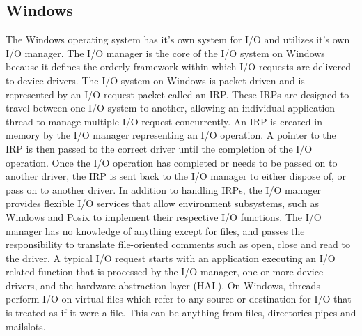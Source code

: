 \documentclass[10pt,draftclsnofoot,onecolumn,journal,compsoc]{IEEEtran}
\begin{document}
\subsection*{Windows}
The Windows operating system has it's own system for I/O and utilizes it's own I/O manager.
        The I/O manager is the core of the I/O system on Windows because it defines the orderly framework within which I/O requests are delivered to device drivers. \cite{Wini}
        The I/O system on Windows is packet driven and is represented by an I/O request packet called an IRP.
        These IRPs are designed to travel between one I/O system to another, allowing an individual application thread to manage multiple I/O request concurrently.
        An IRP is created in memory by the I/O manager representing an I/O operation.
        A pointer to the IRP is then passed to the correct driver until the completion of the I/O operation.
        Once the I/O operation has completed or needs to be passed on to another driver, the IRP is sent back to the I/O manager to either dispose of, or pass on to another driver.
        In addition to handling IRPs, the I/O manager provides flexible I/O services that allow environment subsystems, such as Windows and Posix to implement their respective I/O functions.
        The I/O manager has no knowledge of anything except for files, and passes the responsibility to translate file-oriented comments such as open, close and read to the driver.
        A typical I/O request starts with an application executing an I/O related function that is processed by the I/O manager, one or more device drivers, and the hardware abstraction layer (HAL).
        On Windows, threads perform I/O on virtual files which refer to any source or destination for I/O that is treated as if it were a file.
        This can be anything from files, directories pipes and mailslots.
\end{document}

